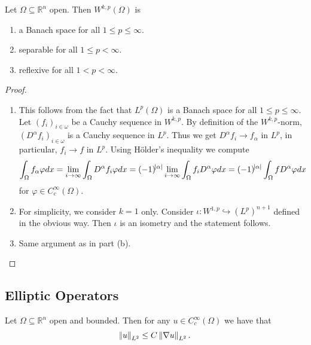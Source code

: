 \begin{theorem}
	Let $\Omega \subseteq \mathbb{R}^n$ open. Then $W^{k,p}(\Omega)$ is
	\begin{enumerate}[label = \textup{(}\alph*\textup{)},wide = 0pt]
		\item a Banach space for all $1 \leq p \leq \infty$.
		\item separable for all $1 \leq p < \infty$.
		\item reflexive for all $1 < p < \infty$.
	\end{enumerate}
\end{theorem}

\begin{proof}
	~
	\begin{enumerate}[label = \textup{(}\alph*\textup{)},wide = 0pt]
		\item This follows from the fact that $L^p(\Omega)$ is a Banach space for all $1 \leq p \leq \infty$. Let $(f_i)_{i \in \omega}$ be a Cauchy sequence in $W^{k,p}$. By definition of the $W^{k,p}$-norm, $(D^\alpha f_i)_{i \in \omega}$ is a Cauchy sequence in $L^p$. Thus we get $D^\alpha f_i \to f_\alpha$ in $L^p$, in particular, $f_i \to f$ in $L^p$. Using H\"older's inequality we compute
			\begin{equation*}
				\int_\Omega f_\alpha \varphi dx = \lim_{i \to \infty} \int_\Omega D^\alpha f_i \varphi dx = (-1)^{\abs{\alpha}} \lim_{i \to \infty}\int_\Omega f_i D^\alpha \varphi dx = (-1)^{\abs{\alpha}}\int_\Omega f D^\alpha \varphi dx
			\end{equation*}
			\noindent for $\varphi \in C^\infty_c(\Omega)$.
		\item For simplicity, we consider $k = 1$ only. Consider $\iota : W^{1,p} \hookrightarrow (L^p)^{n + 1}$ defined in the obvious way. Then $\iota$ is an isometry and the statement follows. 
		\item Same argument as in part (b).
	\end{enumerate}
\end{proof}

\subsection*{Elliptic Operators}

\begin{lemma}
	\label{lem:PI}
	Let $\Omega \subseteq \mathbb{R}^n$ open and bounded. Then for any $u \in C^\infty_c(\Omega)$ we have that
	\begin{equation*}
		\norm{u}_{L^2} \leq C\norm[0]{\nabla u}_{L^2}.
	\end{equation*}
\end{lemma}

